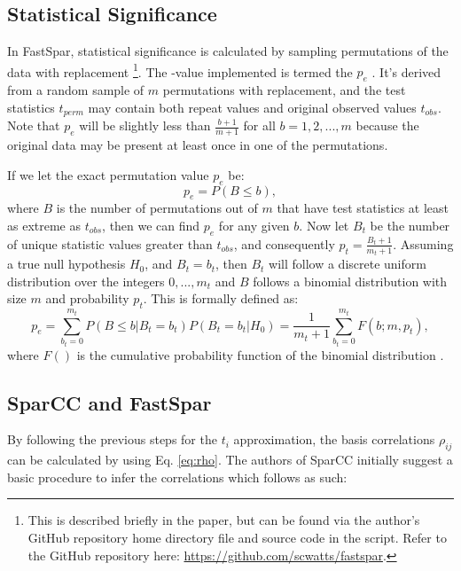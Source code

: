 \subsection{Statistical Significance}\label{theory-signif}
In \acrshort{FastSpar}, statistical significance is calculated by sampling permutations of the data with replacement \citep{Watts2018}\footnote{This is described briefly in the paper, but can be found via the author's GitHub repository home directory  file and source code in the   script. Refer to the GitHub repository here: \url{https://github.com/scwatts/fastspar}.}. The -value implemented is termed the  $p_e$ \citep{Phipson2010}. It's derived from a random sample of $m$ permutations with replacement, and the test statistics $t_{perm}$ may contain both repeat values and original observed values $t_{obs}$. Note that $p_e$ will be slightly less than $\frac{b+1}{m+1}$ for all $b = 1,2,...,m$ because the original data may be present at least once in one of the permutations.

If we let the exact permutation value $p_e$ be:
\begin{equation}\label{eq:p_e1}
    p_e = P\left( B \leq b \right),
\end{equation}
where $B$ is the number of permutations out of $m$ that have test statistics at least as extreme as $t_{obs}$, then we can find $p_e$ for any given $b$. Now let $B_t$ be the number of unique statistic values greater than $t_{obs}$, and consequently $p_t = \frac{B_t+1}{m_t+1}$. Assuming a true null hypothesis $H_0$, and $B_t = b_t$, then $B_t$ will follow a discrete uniform distribution over the integers $0,...,m_t$ and $B$ follows a binomial distribution with size $m$ and probability $p_t$. This is formally defined as:
\begin{equation}\label{eq:pe_2}
    p_e = \sum_{b_t=0}^{m_t} P\left(B \leq b|B_t = b_t \right) P\left(B_t = b_t| H_0 \right) = \frac{1}{m_t +1}\sum_{b_t=0}^{m_t} F\left( b;m,p_t \right),
\end{equation}
where $F()$ is the cumulative probability function of the binomial distribution \citep{Phipson2010}.

\subsection{SparCC and FastSpar}\label{theory-sparcc-algo}
By following the previous steps for the $t_i$ approximation, the basis correlations $\rho_{ij}$ can be calculated by using Eq. \ref{eq:rho}. The authors of \acrshort{SparCC} initially suggest a basic procedure to infer the correlations which follows as such:

